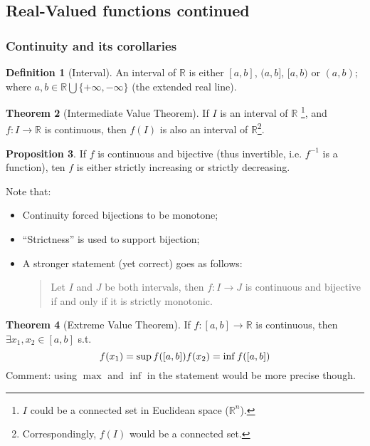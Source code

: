 \documentclass[12pt]{article}
\newcommand{\R}{{\mathbb R}}
\theoremstyle{definition}
\newtheorem{theorem}{Theorem}[section]
\newtheorem{definition}[theorem]{Definition}
\newtheorem{proposition}[theorem]{Proposition}
\theoremstyle{plain}
\begin{document}
\subsection{Real-Valued functions continued}
\setcounter{theorem}{0}

\subsubsection{Continuity and its corollaries}
\begin{definition}
    [Interval]
    An interval of $\R$ is either $[a,b]$, $(a,b]$, $[a,b)$ or $(a,b)$; where 
    $a, b \in \R\bigcup \{ +\infty, -\infty\}$ (the extended real line).
\end{definition}

\begin{theorem}
    [Intermediate Value Theorem]

    If $I$ is an interval of $\R$ \footnote{ $I$ could be a connected set 
    in Euclidean space ($\R^n$).}, and $f:I \to \R$ is continuous, then $f(I)$ is also an 
    interval of $\R$\footnote{Correspondingly, $f(I)$ would be a connected set.}.
\end{theorem}

\begin{proposition}
    If $f$ is continuous and bijective (thus invertible, i.e. $f^{-1}$ is a 
    function), ten $f$ is either strictly increasing or strictly decreasing.

    Note that: 
    \begin{itemize}
        \item Continuity forced bijections to be monotone;
        \item ``Strictness'' is used to support bijection;
        \item A stronger statement (yet correct) goes as follows: 
        \begin{quote}
            Let $I$ and $J$ be both intervals, then 
            $f:I \to J$ is continuous and bijective if and only if it is strictly 
            monotonic.
        \end{quote}
    \end{itemize}
\end{proposition}

\begin{theorem}
    [Extreme Value Theorem]
    If $f: [a,b] \to \R$ is continuous, then $\exists x_1, x_2 \in [a,b]$ s.t. 
    \[
        f(x_1) = \sup f([a,b])\\
        f(x_2) = \inf f([a,b])
    \]
    Comment: using $\max$ and $\inf$ in the statement would be more precise 
    though.
\end{theorem}
\end{document}
